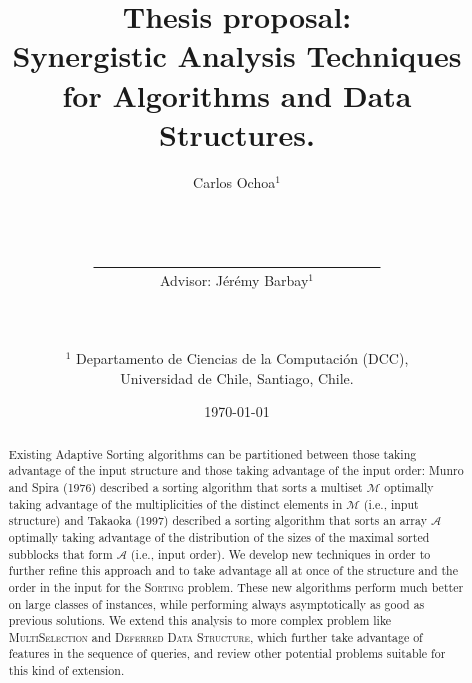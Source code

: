 \documentclass[10pt]{article}
\title{Thesis proposal: \\Synergistic Analysis Techniques\\ for Algorithms and Data Structures.}
\author{Carlos Ochoa$^{1}$
  \\\\\\\\\underline{\ \ \ \ \ \ \ \ \ \ \ \ \ \ \ \ \ \ \ \ \ \ \ \ \
    \ \ \ \ \ \ \ \ \ \ \ \ \ \ \ \ }
  \\Advisor: J\'er\'emy Barbay$^1$\\\\\\\\
  $^1$ Departamento de Ciencias de la Computaci\'on (DCC),\\ Universidad de Chile, Santiago, Chile.
}
\date{\today}
\begin{document}
\maketitle
\begin{abstract}
  Existing Adaptive Sorting algorithms can be partitioned between
  those taking advantage of the input structure and those taking
  advantage of the input order: Munro and Spira (1976) described a
  sorting algorithm that sorts a multiset $\mathcal{M}$ optimally
  taking advantage of the multiplicities of the distinct elements in
  $\mathcal{M}$ (i.e., input structure) and Takaoka (1997) described a
  sorting algorithm that sorts an array $\mathcal{A}$ optimally taking
  advantage of the distribution of the sizes of the maximal sorted
  subblocks that form $\mathcal{A}$ (i.e., input order). We develop new
  techniques in order to further refine this approach and to take
  advantage all at once of the structure and the order in the input
  for the \textsc{Sorting} problem. These new algorithms perform much
  better on large classes of instances, while performing always
  asymptotically as good as previous solutions. We extend this
  analysis to more complex problem like \textsc{MultiSelection} and
  \textsc{Deferred Data Structure}, which further take advantage of
  features in the sequence of queries, and review other potential problems
  suitable for this kind of extension.
\end{abstract}
\clearpage





\end{document}
